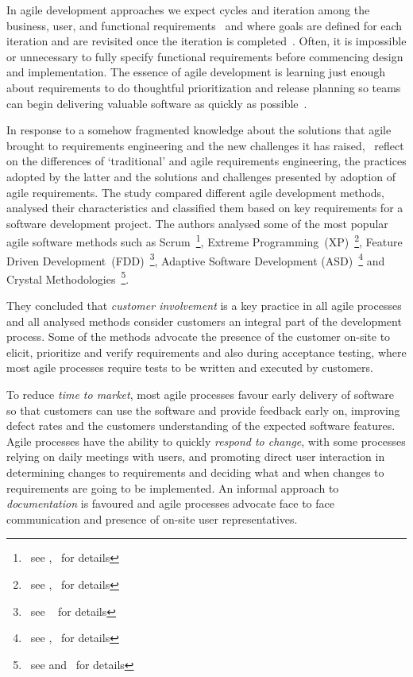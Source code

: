 \documentclass[dissertation,final]{softeng}
\begin{document}
In agile development approaches we expect cycles and iteration among the business, user, and functional requirements~\citep{Wiegers2013} and where goals are defined for each iteration and are revisited once the iteration is completed~\citep{Inayat2015}. Often, it is impossible or unnecessary to fully specify functional requirements before commencing design and implementation. The essence of agile development is learning just enough about requirements to do thoughtful prioritization and release planning so teams can begin delivering valuable software as quickly as possible~\citep{Wiegers2013}.

In response to a somehow fragmented knowledge about the solutions that agile brought to requirements engineering and the new challenges it has raised,~\citet{Qasaimeh2008} reflect on the differences of `traditional' and agile requirements engineering, the practices adopted by the latter and the solutions and challenges presented by adoption of agile requirements. The study compared different agile development methods, analysed their characteristics and classified them based on key requirements for a software development project. The authors analysed some of the most popular agile software methods such as Scrum~\footnote{~see ,~ \citet{Schwaber:2001:ASD:559553} for details}, Extreme Programming~(XP)~\footnote{~see ,~ \citet{Beck:1999:EPE:318762} for details}, Feature Driven Development~(FDD)~\footnote{~see ~\citet{Palmer:2001:PGF:600044} for details}, Adaptive Software Development (ASD)~\footnote{~see ,~ \citet{Highsmith:2000:ASD:323922} for details} and Crystal Methodologies~\footnote{~see  and~ \citet{CockburnCrystal2004} for details}.

They concluded that \emph{customer involvement} is a key practice in all agile processes and all analysed methods consider customers an integral part of the development process. Some of the methods advocate the presence of the customer on-site to elicit, prioritize and verify requirements and also during acceptance testing, where most agile processes require tests to be written and executed by customers.

To reduce \emph{time to market}, most agile processes favour early delivery of software so that customers can use the software and provide feedback early on, improving defect rates and the customers understanding of the expected software features. Agile processes have the ability to quickly \emph{respond to change}, with some processes relying on daily meetings with users, and promoting direct user interaction in determining changes to requirements and deciding what and when changes to requirements are going to be implemented. An informal approach to \emph{documentation} is favoured and agile processes advocate face to face communication and presence of on-site user representatives.
\end{document}
